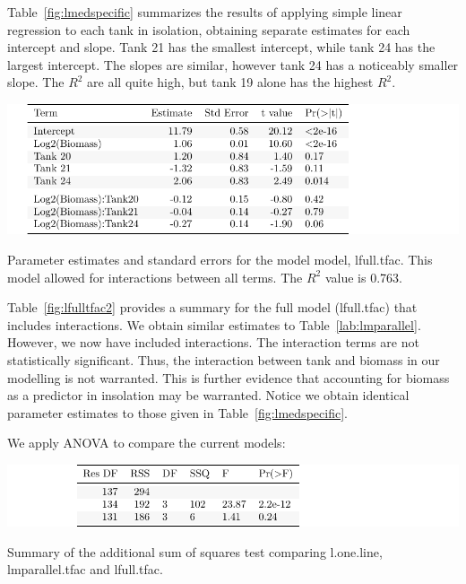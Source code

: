 Table~\ref{fig:lmedspecific} summarizes the results of applying simple linear regression to each tank in isolation, obtaining separate estimates for each intercept and slope. Tank 21 has the smallest intercept, while tank 24 has the largest intercept. The slopes are similar, however tank 24 has a noticeably smaller slope. The $R^{2}$ are all quite high, but tank 19 alone has the highest $R^{2}$. 



   \vspace{12pt}



\begin{table}[H]
\includegraphics{Chapter3Images/lfulltfac.pdf}
\caption{Parameter estimates and standard errors for the model model, lfull.tfac. This model allowed for interactions between all terms. The $R^{2}$ value is 0.763.}
\label{fig:lfulltfac2}
\end{table}

Table~\ref{fig:lfulltfac2} provides a summary for the full model (lfull.tfac) that includes interactions. We obtain similar estimates to Table~\ref{lab:lmparallel}. However, we now have included interactions. The interaction terms are not statistically significant.  Thus, the interaction between tank and biomass in our modelling is not warranted. This is further evidence that accounting for biomass as a predictor in insolation may be warranted. Notice we obtain identical parameter estimates to those given in Table~\ref{fig:lmedspecific}.

\newpage

We apply ANOVA to compare the current models:

   \vspace{12pt}



\begin{table}[H]
\includegraphics{Chapter3Images/anova1.pdf}
\caption{Summary of the additional sum of squares test comparing l.one.line,  lmparallel.tfac and lfull.tfac.}
\label{fig:anovacompare2}
\end{table}


